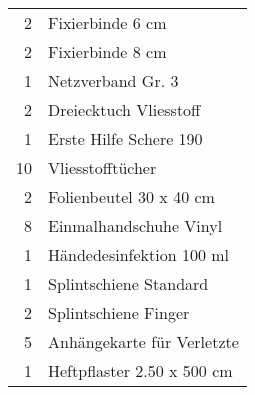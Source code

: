 \begin{tabular}{r|l}
        2     & Fixierbinde 6 cm                                         \\ 
        2     & Fixierbinde 8 cm                                         \\ 
        1     & Netzverband Gr. 3                                                        \\ 
        2     & Dreiecktuch Vliesstoff                                                   \\ 
        1     & Erste Hilfe Schere 190                                                   \\ 
        10    & Vliesstofftücher                                                         \\ 
        2     & Folienbeutel 30 x 40 cm				                 \\ 
        8     & Einmalhandschuhe Vinyl                                                   \\ 
        1     & Händedesinfektion 100 ml                                \\ 
        1     & Splintschiene Standard                                                   \\ 
        2     & Splintschiene Finger                                                     \\ 
        5     & Anhängekarte für Verletzte                                               \\ 
        1     & Heftpflaster 2.50 x 500 cm	    		                 \\
    \end{tabular}